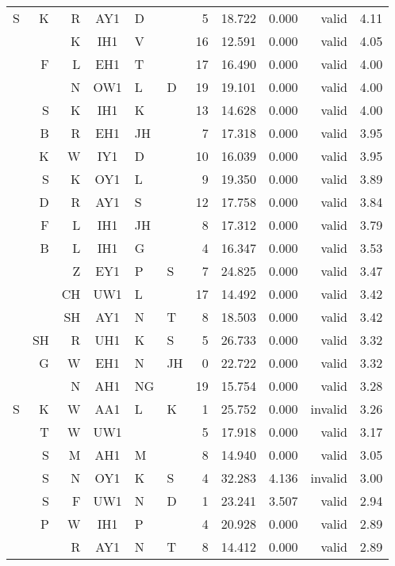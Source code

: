 \documentclass[12pt]{article}
\begin{document}
\begin{longtable}{r@{ }r@{ }r@{ }c@{ }l@{ }l@{ } rrrrr}
S &  K &  R & AY1 & D  &    &  5 & 18.722 & 0.000 &   valid & 4.11 \\
  &    &  K & IH1 & V  &    & 16 & 12.591 & 0.000 &   valid & 4.05 \\
  &  F &  L & EH1 & T  &    & 17 & 16.490 & 0.000 &   valid & 4.00 \\
  &    &  N & OW1 & L  & D  & 19 & 19.101 & 0.000 &   valid & 4.00 \\
  &  S &  K & IH1 & K  &    & 13 & 14.628 & 0.000 &   valid & 4.00 \\
  &  B &  R & EH1 & JH &    &  7 & 17.318 & 0.000 &   valid & 3.95 \\
  &  K &  W & IY1 & D  &    & 10 & 16.039 & 0.000 &   valid & 3.95 \\
  &  S &  K & OY1 & L  &    &  9 & 19.350 & 0.000 &   valid & 3.89 \\
  &  D &  R & AY1 & S  &    & 12 & 17.758 & 0.000 &   valid & 3.84 \\
  &  F &  L & IH1 & JH &    &  8 & 17.312 & 0.000 &   valid & 3.79 \\
  &  B &  L & IH1 & G  &    &  4 & 16.347 & 0.000 &   valid & 3.53 \\
  &    &  Z & EY1 & P  & S  &  7 & 24.825 & 0.000 &   valid & 3.47 \\
  &    & CH & UW1 & L  &    & 17 & 14.492 & 0.000 &   valid & 3.42 \\
  &    & SH & AY1 & N  & T  &  8 & 18.503 & 0.000 &   valid & 3.42 \\
  & SH &  R & UH1 & K  & S  &  5 & 26.733 & 0.000 &   valid & 3.32 \\
  &  G &  W & EH1 & N  & JH &  0 & 22.722 & 0.000 &   valid & 3.32 \\
  &    &  N & AH1 & NG &    & 19 & 15.754 & 0.000 &   valid & 3.28 \\
S &  K &  W & AA1 & L  & K  &  1 & 25.752 & 0.000 & invalid & 3.26 \\
  &  T &  W & UW1 &    &    &  5 & 17.918 & 0.000 &   valid & 3.17 \\
  &  S &  M & AH1 & M  &    &  8 & 14.940 & 0.000 &   valid & 3.05 \\
  &  S &  N & OY1 & K  & S  &  4 & 32.283 & 4.136 & invalid & 3.00 \\
  &  S &  F & UW1 & N  & D  &  1 & 23.241 & 3.507 &   valid & 2.94 \\
  &  P &  W & IH1 & P  &    &  4 & 20.928 & 0.000 &   valid & 2.89 \\
  &    &  R & AY1 & N  & T  &  8 & 14.412 & 0.000 &   valid & 2.89 \\

\end{longtable}
\end{document}
